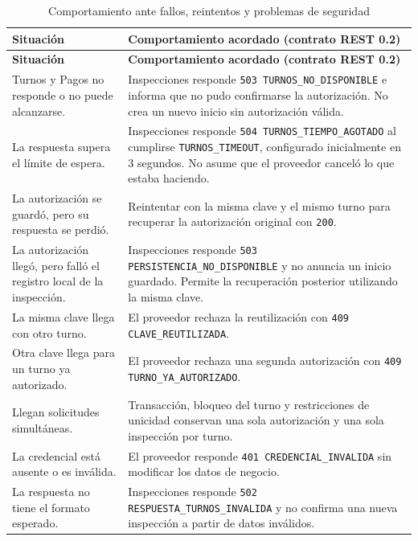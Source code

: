 \documentclass[11pt,a4paper]{article}
\begin{document}
	\begin{xltabular}{\textwidth}{L{4.2cm}X}
		\caption{Comportamiento ante fallos, reintentos y problemas de seguridad}\label{tab:fallos}\\
		\toprule
		\textbf{Situación} & \textbf{Comportamiento acordado (contrato REST 0.2)} \\
		\midrule
		\endfirsthead
		\toprule
		\textbf{Situación} & \textbf{Comportamiento acordado (contrato REST 0.2)} \\
		\midrule
		\endhead
		\bottomrule
		\endfoot
		Turnos y Pagos no responde o no puede alcanzarse. & Inspecciones responde \texttt{503 TURNOS\_NO\_DISPONIBLE} e informa que no pudo confirmarse la autorización. No crea un nuevo inicio sin autorización válida. \\
		La respuesta supera el límite de espera. & Inspecciones responde \texttt{504 TURNOS\_TIEMPO\_AGOTADO} al cumplirse \texttt{TURNOS\_TIMEOUT}, configurado inicialmente en 3 segundos. No asume que el proveedor canceló lo que estaba haciendo. \\
		La autorización se guardó, pero su respuesta se perdió. & Reintentar con la misma clave y el mismo turno para recuperar la autorización original con \texttt{200}. \\
		La autorización llegó, pero falló el registro local de la inspección. & Inspecciones responde \texttt{503 PERSISTENCIA\_NO\_DISPONIBLE} y no anuncia un inicio guardado. Permite la recuperación posterior utilizando la misma clave. \\
		La misma clave llega con otro turno. & El proveedor rechaza la reutilización con \texttt{409 CLAVE\_REUTILIZADA}. \\
		Otra clave llega para un turno ya autorizado. & El proveedor rechaza una segunda autorización con \texttt{409 TURNO\_YA\_AUTORIZADO}. \\
		Llegan solicitudes simultáneas. & Transacción, bloqueo del turno y restricciones de unicidad conservan una sola autorización y una sola inspección por turno. \\
		La credencial está ausente o es inválida. & El proveedor responde \texttt{401 CREDENCIAL\_INVALIDA} sin modificar los datos de negocio. \\
		La respuesta no tiene el formato esperado. & Inspecciones responde \texttt{502 RESPUESTA\_TURNOS\_INVALIDA} y no confirma una nueva inspección a partir de datos inválidos. \\
	\end{xltabular}
	
\end{document}
